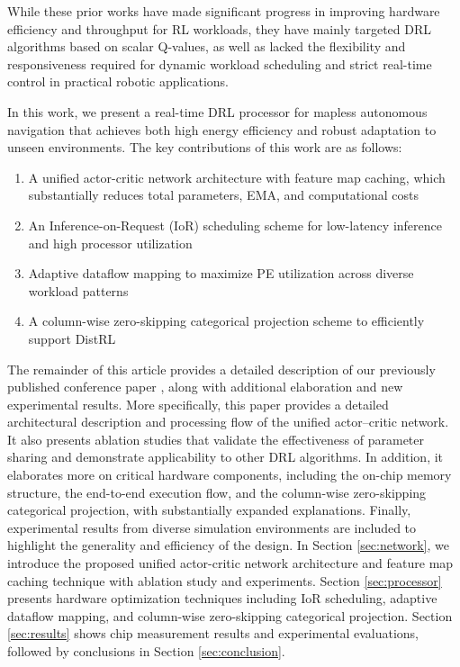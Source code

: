 While these prior works have made significant progress in improving hardware efficiency and throughput for RL workloads, they have mainly targeted DRL algorithms based on scalar Q-values, as well as lacked the flexibility and responsiveness required for dynamic workload scheduling and strict real-time control in practical robotic applications.

In this work, we present a real-time DRL processor for mapless autonomous navigation that achieves both high energy efficiency and robust adaptation to unseen environments. The key contributions of this work are as follows:
 \begin{enumerate}
    \item A unified actor-critic network architecture with feature map caching, which substantially reduces total parameters, EMA, and computational costs
    \item An Inference-on-Request (IoR) scheduling scheme for low-latency inference and high processor utilization
    \item Adaptive dataflow mapping to maximize PE utilization across diverse workload patterns
    \item A column-wise zero-skipping categorical projection scheme to efficiently support DistRL
\end{enumerate}

The remainder of this article provides a detailed description of our previously published conference paper \cite{RL_CICC}, along with additional elaboration and new experimental results. More specifically, this paper provides a detailed architectural description and processing flow of the unified actor–critic network. It also presents ablation studies that validate the effectiveness of parameter sharing and demonstrate applicability to other DRL algorithms. In addition, it elaborates more on critical hardware components, including the on-chip memory structure, the end-to-end execution flow, and the column-wise zero-skipping categorical projection, with substantially expanded explanations. Finally, experimental results from diverse simulation environments are included to highlight the generality and efficiency of the design. In Section \ref{sec:network}, we introduce the proposed unified actor-critic network architecture and feature map caching technique with ablation study and experiments. Section \ref{sec:processor} presents hardware optimization techniques including IoR scheduling, adaptive dataflow mapping, and column-wise zero-skipping categorical projection. Section \ref{sec:results} shows chip measurement results and experimental evaluations, followed by conclusions in Section \ref{sec:conclusion}.

